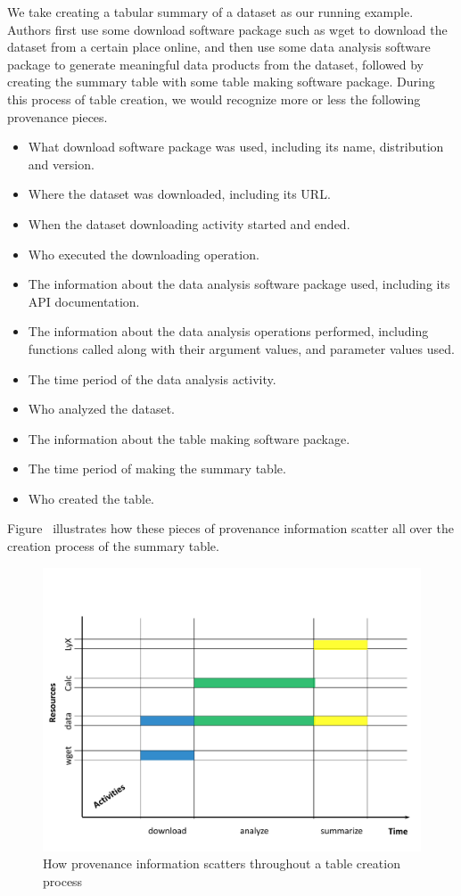 We take creating a tabular summary of a dataset as our running example. Authors first use some 
download software package such as wget to download the dataset from a certain place online, and then 
use some data analysis software package to generate meaningful data products from the dataset, 
followed by creating the summary table with some table making software package. During this process 
of table creation, we would recognize more or less the following provenance pieces.
\begin{itemize}
\item What download software package was used, including its name, distribution and version.
\item Where the dataset was downloaded, including its URL.
\item When the dataset downloading activity started and ended.
\item Who executed the downloading operation.
\item The information about the data analysis software package used, including its API documentation.
\item The information about the data analysis operations performed, including functions called along 
with their argument values, and parameter values used. 
\item The time period of the data analysis activity.
\item Who analyzed the dataset.
\item The information about the table making software package.
\item The time period of making the summary table.
\item Who created the table.
\end{itemize}
Figure~\cite{prov-pieces} illustrates how these pieces of provenance information scatter all over the 
creation process of the summary table.
\begin{figure}
\label{prov-pieces}
\centering
\includegraphics[scale=0.5]{prov-pieces}
\caption{How provenance information scatters throughout a table creation process}
\end{figure}
